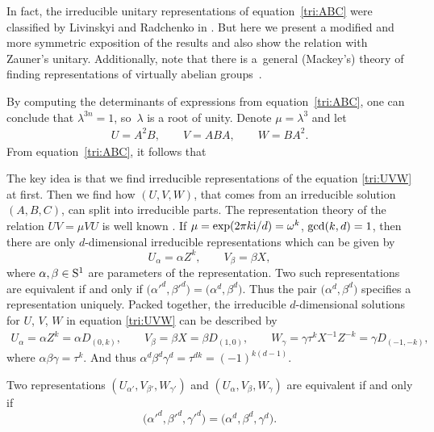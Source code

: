 In fact, the irreducible unitary representations of equation~\eqref{tri:ABC} were
classified by Livinskyi and Radchenko in \cite{RL}. But here we present a modified and more
symmetric exposition of the results and also show the relation with Zauner's unitary.
Additionally, note that there is a~general (Mackey's) theory of finding representations
of virtually abelian groups~\cite{Kyr}.

By computing the determinants of expressions from equation~\eqref{tri:ABC}, one can conclude that $\lambda^{3n} = 1$,
so~$\lambda$ is a root of unity.
Denote $\mu = \lambda^3$ and let
\begin{align*}
U = A^2B,
\qquad
V = ABA,
\qquad
W = BA^2.
\end{align*}
From equation~\eqref{tri:ABC}, it follows that

The key idea is that we find irreducible representations of the equation \eqref{tri:UVW}
at first.
Then we find how $(U,V,W)$, that comes from an irreducible solution $(A,B,C)$,
can split into irreducible parts.
The representation theory of the relation $UV=\mu VU$ is well known \cite{Davidson,Weyl}.
If $\mu = \exp (2\pi k{\rm i}/d)  = \omega^k$, ${\rm gcd}(k,d)=1$,
then there are only $d$-dimensional irreducible representations which can be given by
\[
U_\alpha = \alpha Z^k,
\qquad
V_\beta = \beta X,
\]
where $\alpha, \beta \in {\rm S}^1$ are parameters of the representation.
Two such representations are equivalent if and only if
$\bigl(\alpha'^d, \beta'^d\bigr) = \bigl(\alpha^d, \beta^d\bigr)$. Thus the pair $\bigl(\alpha^d, \beta^d\bigr)$
specifies a representation uniquely.
Packed together, the irreducible $d$-dimensional solutions for $U$, $V$, $W$ in equation \eqref{tri:UVW}
can be described by
\begin{gather}
  U_\alpha = \alpha Z^k = \alpha D_{(0,k)},\qquad V_\beta = \beta X = \beta D_{(1,0)}, \qquad
 W_\gamma = \gamma \tau^k X^{-1}Z^{-k} = \gamma D_{(-1,-k)},\label{tri:UVWsol}
\end{gather}
where $\alpha \beta \gamma = \tau^k$.
And thus $\alpha^d \beta^d \gamma^d = \tau^{dk} = (-1)^{k(d-1)}$.

Two representations $(U_{\alpha'}, V_{\beta'}, W_{\gamma'})$ and $(U_\alpha, V_\beta, W_\gamma)$
are equivalent if and only if
\[
\bigl(\alpha'^d, \beta'^d, \gamma'^d\bigr) =\allowbreak \bigl(\alpha^d, \beta^d, \gamma^d\bigr).
\]

